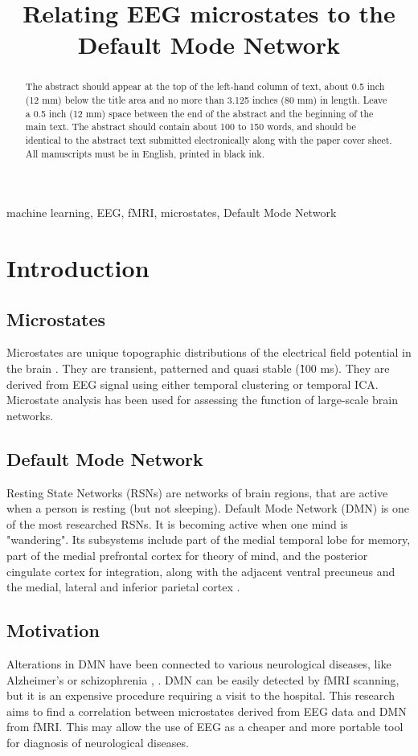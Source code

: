 \documentclass{article}
\title{Relating EEG microstates to the Default Mode Network}
\begin{document}
%

\maketitle
%
\begin{abstract}
The abstract should appear at the top of the left-hand column of text, about
0.5 inch (12 mm) below the title area and no more than 3.125 inches (80 mm) in
length.  Leave a 0.5 inch (12 mm) space between the end of the abstract and the
beginning of the main text.  The abstract should contain about 100 to 150
words, and should be identical to the abstract text submitted electronically
along with the paper cover sheet.  All manuscripts must be in English, printed
in black ink.
\end{abstract}
%
\begin{keywords}
machine learning, EEG, fMRI, microstates, Default Mode Network
\end{keywords}
%
\section{Introduction}
\label{sec:intro}
\subsection{Microstates}
Microstates are unique topographic distributions of the electrical field 
potential in the brain  \cite{Khanna2015105}. They are transient, patterned and quasi stable 
(\~100 ms). They are derived from EEG signal using either temporal clustering 
or temporal ICA. Microstate analysis has been used for assessing the function of large-scale brain networks.

\subsection{Default Mode Network}
Resting State Networks (RSNs) are networks of brain regions, that are active when a person is resting (but not sleeping). Default Mode Network (DMN) is one of the most researched RSNs. It is becoming active when one mind is "wandering". Its subsystems include part of the medial temporal lobe for memory, part of the medial prefrontal cortex for theory of mind, and the posterior cingulate cortex for integration, along with the adjacent ventral precuneus and the medial, lateral and inferior parietal cortex \cite{dmn_description}.
\subsection{Motivation}
\label{sec:motivation}
Alterations in DMN have been connected to various neurological diseases, like Alzheimer’s or schizophrenia \cite{Yuan20122062}, \cite{Khanna2015105}. DMN can be easily detected by fMRI scanning, but it is an expensive procedure requiring a visit to the hospital. This research aims to find a correlation between microstates derived from EEG data and DMN from fMRI. This may allow the use of EEG as a cheaper and more portable tool for diagnosis of neurological diseases.
\end{document}
